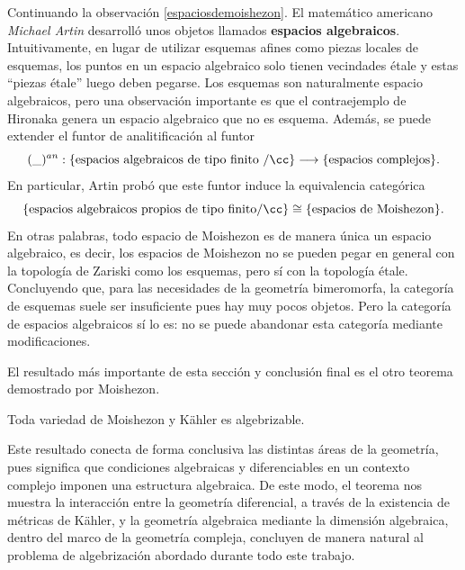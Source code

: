 \begin{remark}\parencite[Chap. VII, Sec. 6.4]{grauertremment}
	Continuando la observación \ref{espaciosdemoishezon}. El matemático americano \textit{Michael Artin} desarrolló unos objetos llamados \textbf{espacios algebraicos}. Intuitivamente, en lugar de utilizar esquemas afines como piezas locales de esquemas, los puntos en un espacio algebraico solo tienen vecindades étale y estas \enquote{piezas étale} luego deben pegarse. Los esquemas son naturalmente espacio algebraicos, pero una observación importante es que el contraejemplo de Hironaka genera un espacio algebraico que no es esquema. Además, se puede extender el funtor de analitificación al funtor
	\begin{equation*}
		(\_)^{an}:\{\text{espacios algebraicos de tipo finito }/\cc\}\longrightarrow\{\text{espacios complejos}\}.
	\end{equation*}
	En particular, Artin probó que este funtor induce la equivalencia categórica
	\begin{equation*}
		\{\text{espacios algebraicos propios de tipo finito}/\cc\}\cong\{\text{espacios de Moishezon}\}.
	\end{equation*}
	En otras palabras, todo espacio de Moishezon es de manera única un espacio algebraico, es decir, los espacios de Moishezon no se pueden pegar en general con la topología de Zariski como los esquemas, pero sí con la topología étale. Concluyendo que, para las necesidades de la geometría bimeromorfa, la categoría de esquemas suele ser insuficiente pues hay muy pocos objetos. Pero la categoría de espacios algebraicos sí lo es: no se puede abandonar esta categoría mediante modificaciones. 
\end{remark}

El resultado más importante de esta sección y conclusión final es el otro teorema demostrado por Moishezon.

\begin{theorem}\parencite{Moishezon1967}\label{fundamentaldemoishezon}
	Toda variedad de Moishezon y Kähler es algebrizable.
\end{theorem}

Este resultado conecta de forma conclusiva las distintas áreas de la geometría, pues significa que condiciones algebraicas y diferenciables en un contexto complejo imponen una estructura algebraica. De este modo, el teorema nos muestra la interacción entre la geometría diferencial, a través de la existencia de métricas de Kähler, y la geometría algebraica mediante la dimensión algebraica, dentro del marco de la geometría compleja, concluyen de manera natural al problema de algebrización abordado durante todo este trabajo. 